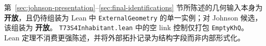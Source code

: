 \documentclass[11pt]{amsart}
\theoremstyle{definition}
\theoremstyle{remark}
\newcommand{\Open}{\textbf{开放}}
\begin{document}
第~\ref{sec:johnson-presentation}--\ref{sec:final-identifications} 节所陈述的几何输入本身为 \Open，且仍待组装为 Lean 中 \texttt{ExternalGeometry} 的单一实例；对 Johnson 候选，该组装为 \Open。
\texttt{T73S4Inhabitant.lean} 中的空 link 控制仅打包 \texttt{EmptyKhQ}。Lean 定理不消费更强陈述，并将外部拓扑记录为结构字段而非内部形式化。



\end{document}
